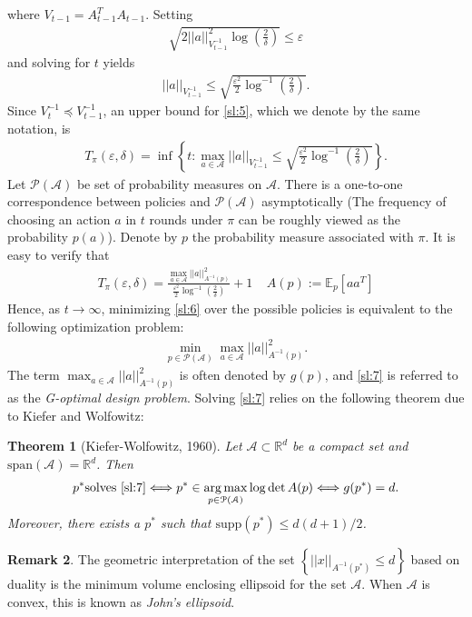\documentclass[10pt,a4paper]{amsart}
\numberwithin{equation}{section}
\theoremstyle{plain}
\newtheorem{Th}{Theorem}
\theoremstyle{definition}
\newtheorem{Rem}[Th]{Remark}
\def\R{{\mathbb R}}
\def\E{{\mathbb E}}
\def\R{{\mathbb R}}
\def\e{{\varepsilon}}
\DeclareMathOperator*{\argmax}{arg\,max}
\begin{document}
where $V_{t-1} = A^T_{t-1}A_{t-1}$. Setting 
\begin{align*}
\sqrt{2||a||^2_{V_{t-1}^{-1}}\log\left(\frac{2}{\delta}\right)}\leq\e
\end{align*}
and solving for $t$ yields
\begin{align*}
||a||_{V_{t-1}^{-1}}\leq\sqrt{\frac{\e^2}{2}\log^{-1}\left(\frac{2}{\delta}\right)}.
\end{align*}
Since $V_t^{-1}\preceq V^{-1}_{t-1}$, an upper bound for \eqref{sl:5}, which we denote by the same notation, is
\begin{align}
T_{\pi}(\e, \delta) = \inf\left\{t: \max_{a\in\mathcal A}||a||_{V_{t-1}^{-1}}\leq \sqrt{\frac{\e^2}{2}\log^{-1}\left(\frac{2}{\delta}\right)}\right\}.\label{sl:6}
\end{align}
Let $\mathcal P(\mathcal A)$ be set of probability measures on $\mathcal A$. There is a one-to-one correspondence between policies and $\mathcal P(\mathcal A)$ asymptotically (The frequency of choosing an action $a$ in $t$ rounds under $\pi$ can be roughly viewed as the probability $p(a)$). Denote by $p$ the probability measure associated with $\pi$. It is easy to verify that 
\begin{align*}
T_{\pi}(\e, \delta) = \frac{\max_{a\in\mathcal A}||a||^2_{A^{-1}(p)}}{\frac{\e^2}{2}\log^{-1}\left(\frac{2}{\delta}\right)}+1\ \ \ \ \ A(p):=\E_p[aa^T]
\end{align*}
Hence, as $t\to\infty$, minimizing \eqref{sl:6} over the possible policies is equivalent to the following optimization problem:
\begin{align}
\min_{p\in\mathcal P(\mathcal A)}\max_{a\in\mathcal A}||a||^2_{A^{-1}(p)}.\label{sl:7}
\end{align}
The term $\max_{a\in\mathcal A}||a||^2_{A^{-1}(p)}$ is often denoted by $g(p)$, and \eqref{sl:7} is referred to as the \emph{G-optimal design problem}. Solving \eqref{sl:7} relies on the following theorem due to Kiefer and Wolfowitz:
\begin{Th}[Kiefer-Wolfowitz, 1960]\label{KW}
Let $\mathcal A\subset\R^d$ be a compact set and $\text{span}(\mathcal A)=\R^d$. Then
\begin{align*}
p^*\text{solves \eqref{sl:7}}\Longleftrightarrow p^*\in\argmax_{p\in\mathcal P(\mathcal A)}\log\det A(p)\Longleftrightarrow g(p^*) = d. 
\end{align*}
Moreover, there exists a $p^*$ such that $\text{supp}(p^*)\leq d(d+1)/2$. 
\end{Th}
\begin{Rem}
The geometric interpretation of the set $\left\{||x||_{A^{-1}(p^*)}\leq d\right\}$ based on duality is the minimum volume enclosing ellipsoid for the set $\mathcal A$. When $\mathcal A$ is convex, this is known as \emph{John's ellipsoid}.  
\end{Rem}
\end{document}
